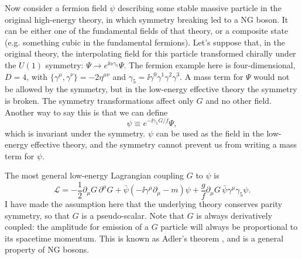 Now consider a fermion field $\psi$ describing some stable massive particle in
the original high-energy theory, in which symmetry breaking led to a NG boson.
It can be either one of the fundamental fields of that theory, or a composite
state (e.g. something cubic in the fundamental fermions). Let's suppose that,
in the original theory, the interpolating field for this particle transformed
chirally under the $U(1)$ symmetry: $\Psi\to e^{\ii\alpha\gamma_5}\Psi$. The
fermion example here is four-dimensional, $D=4$, with
$\{\gamma^\mu,\gamma^\nu\}=-2\eta^{\mu\nu}$ and
$\gamma_5=\ii\gamma^0\gamma^1\gamma^2\gamma^3$. A
mass term for $\Psi$ would not be allowed by the symmetry, but in the low-energy
effective theory the symmetry is broken. The symmetry transformations affect
only $G$ and no other field. Another way to say this is that we can define
\begin{equation}
  \psi\equiv e^{-\ii\gamma_5G/f}\Psi,
  \label{eq:7.2}
\end{equation}
which is invariant under the symmetry. $\psi$ can be used as the field in the
low-energy effective theory, and the symmetry cannot prevent us from writing a
mass term for $\psi$.

The most general low-energy Lagrangian coupling $G$ to $\psi$ is
\begin{equation}
  \mathcal L=-\frac12\partial_\mu G\,\partial^\mu G
  +\bar\psi(-\ii\gamma^\mu\partial_\mu-m)\psi
  +\frac{g}{f}\partial_\mu G\,\bar\psi\gamma^\mu\gamma_5\psi.
  \label{eq:7.3}
\end{equation}
I have made the assumption here that the underlying theory conserves parity
symmetry, so that $G$ is a pseudo-scalar. Note that $G$ is always derivatively
coupled: the amplitude for emission of a $G$ particle will always be
proportional to its spacetime momentum. This is known as Adler's theorem \cite{banks-ref-41}, and is a
general property of NG bosons.


